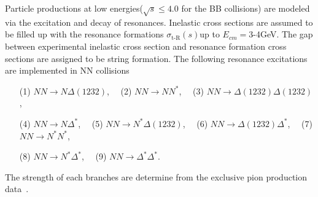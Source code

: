 \documentclass[]{article}
\newcommand{\srt}{\mbox{$\sqrt{s}$}}
\newcommand{\sigtR}{\mbox{$\sigma_{\mbox{t-R}}(s)$}}
\begin{document}
Particle productions at low energies($\srt\leq 4.0$ for the BB collisions)
are modeled via the excitation and decay of resonances.
Inelastic cross sections are assumed to be filled up with
the resonance formations \sigtR up to $E_{cm}=$3-4GeV.
The gap between experimental inelastic cross section
 and resonance formation cross sections
 are assigned to be string formation.
The following resonance excitations are implemented in NN
 collisions
\begin{itemize}
\item[(1)] $NN \to  N\Delta(1232)$,
  \ \ (2) $NN \to  NN^* $,
  \ \ (3) $NN \to  \Delta(1232)\Delta(1232)$,
\item[(4)] $NN \to  N\Delta^* $,
  \ \ (5) $NN \to  N^*\Delta(1232) $,
\ \ (6) $NN \to  \Delta(1232)\Delta^* $,
\ \ (7) $NN \to  N^*N^*  $,
\item[(8)] $NN \to  N^*\Delta^* $,
\ \ (9) $NN \to  \Delta^*\Delta^* $.
\end{itemize}
The strength of each branches are determine from the exclusive
pion production data~\cite{CernHera}.
\end{document}
